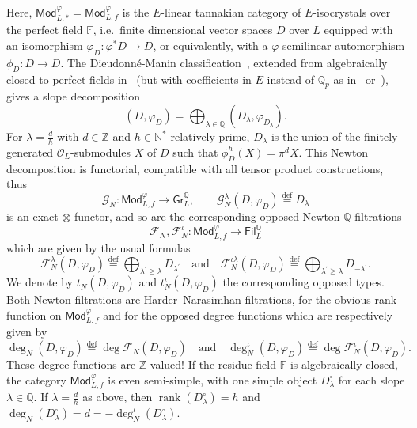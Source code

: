 \documentclass[11pt]{article}
\theoremstyle{definition}
\numberwithin{equation}{section}
\numberwithin{figure}{section}
\numberwithin{table}{section}
\newcommand{\Mod}{\mathsf{Mod}}
\newcommand{\Gra}{\mathsf{Gr}}
\newcommand{\Fil}{\mathsf{Fil}}
\DeclareMathOperator{\rank}{rank}
\newcommand{\eqd}{\stackrel{\mathrm{def}}{=}}
\begin{document}
Here, $\Mod_{L,\ast}^{\varphi}=\Mod_{L,f}^{\varphi}$ is the $E$-linear tannakian category of $E$-isocrystals over the perfect field $\mathbb{F}$, i.e.~finite dimensional vector spaces $D$ over $L$ equipped with an isomorphism $\varphi_{D}:\varphi^{\ast}D\rightarrow D$, or equivalently, with a $\varphi$-semilinear automorphism $\phi_{D}:D\rightarrow D$. The Dieudonn\'e-Manin classification~\cite{Ma63,De86}, extended from algebraically closed to perfect fields in~\cite{Zi84} (but with coefficients in $E$ instead of $\mathbb{Q}_{p}$ as in~\cite{Ko85} or~\cite{FaFo15}), gives a slope decomposition~\cite[VIII \S 1]{DaOrRa10}
\[
(D,\varphi_{D})=\bigoplus_{\lambda\in\mathbb{Q}}(D_{\lambda},\varphi_{D_{\lambda}}).
\]
For $\lambda=\frac{d}{h}$ with $d\in\mathbb{Z}$ and $h\in\mathbb{N}^{\ast}$ relatively prime, $D_{\lambda}$ is the union of the finitely generated $\mathcal{O}_{L}$-submodules $X$ of $D$ such that $\phi_{D}^{h}(X)=\pi^{d}X$. This Newton decomposition is functorial, compatible with all tensor product constructions, thus
\[
\mathcal{G}_{N}:\Mod_{L,f}^{\varphi}\rightarrow\Gra_{L}^{\mathbb{Q}},\qquad\mathcal{G}_{N}^{\lambda}(D,\varphi_{D})\eqd D_{\lambda}
\]
is an exact $\otimes$-functor, and so are the corresponding opposed Newton $\mathbb{Q}$-filtrations
\[
\mathcal{F}_{N},\mathcal{F}_{N}^{\iota}:\Mod_{L,f}^{\varphi}\rightarrow\Fil_{L}^{\mathbb{Q}}
\]
which are given by the usual formulas
\[
\mathcal{F}_{N}^{\lambda}(D,\varphi_{D})\eqd\bigoplus_{\lambda^{\prime}\geq\lambda}D_{\lambda^{\prime}}\quad\text{and}\quad\mathcal{F}_{N}^{\iota\lambda}(D,\varphi_{D})\eqd\bigoplus_{\lambda^{\prime}\geq\lambda}D_{-\lambda^{\prime}}.
\]
We denote by $t_{N}(D,\varphi_{D})$ and $t_{N}^{\iota}(D,\varphi_{D})$ the corresponding opposed types. Both Newton filtrations are Harder--Narasimhan filtrations, for the obvious rank function on $\Mod_{L,f}^{\varphi}$ and for the opposed degree functions which are respectively given by
\[
\deg_{N}(D,\varphi_{D})\eqd\deg\mathcal{F}_{N}(D,\varphi_{D})\quad\text{and}\quad\deg_{N}^{\iota}(D,\varphi_{D})\eqd\deg\mathcal{F}_{N}^{\iota}(D,\varphi_{D}).
\]
These degree functions are $\mathbb{Z}$-valued! If the residue field $\mathbb{F}$ is algebraically closed, the category $\Mod_{L,f}^{\varphi}$ is even semi-simple, with one simple object $D_{\lambda}^{\circ}$ for each slope $\lambda\in\mathbb{Q}$. If $\lambda=\frac{d}{h}$ as above, then $\rank(D_{\lambda}^{\circ})=h$ and $\deg_{N}(D_{\lambda}^{\circ})=d=-\deg_{N}^{\iota}(D_{\lambda}^{\circ})$.
\end{document}
